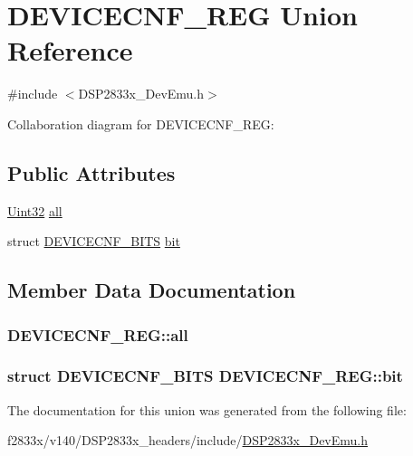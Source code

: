 \hypertarget{union_d_e_v_i_c_e_c_n_f___r_e_g}{}\section{D\+E\+V\+I\+C\+E\+C\+N\+F\+\_\+\+R\+E\+G Union Reference}
\label{union_d_e_v_i_c_e_c_n_f___r_e_g}


{\ttfamily \#include $<$D\+S\+P2833x\+\_\+\+Dev\+Emu.\+h$>$}



Collaboration diagram for D\+E\+V\+I\+C\+E\+C\+N\+F\+\_\+\+R\+E\+G\+:
\subsection*{Public Attributes}
\begin{DoxyCompactItemize}
\item 
\hyperlink{_d_s_p2833x___device_8h_aba99025e657f892beb7ff31cecf64653}{Uint32} \hyperlink{union_d_e_v_i_c_e_c_n_f___r_e_g_acc04b119f54ccbaedc4e712bbec732b3}{all}
\item 
struct \hyperlink{struct_d_e_v_i_c_e_c_n_f___b_i_t_s}{D\+E\+V\+I\+C\+E\+C\+N\+F\+\_\+\+B\+I\+T\+S} \hyperlink{union_d_e_v_i_c_e_c_n_f___r_e_g_a903d04047b135357d6349d10de0faf89}{bit}
\end{DoxyCompactItemize}


\subsection{Member Data Documentation}
\hypertarget{union_d_e_v_i_c_e_c_n_f___r_e_g_acc04b119f54ccbaedc4e712bbec732b3}{}
\subsubsection[{all}]{ D\+E\+V\+I\+C\+E\+C\+N\+F\+\_\+\+R\+E\+G\+::all}\label{union_d_e_v_i_c_e_c_n_f___r_e_g_acc04b119f54ccbaedc4e712bbec732b3}
\hypertarget{union_d_e_v_i_c_e_c_n_f___r_e_g_a903d04047b135357d6349d10de0faf89}{}
\subsubsection[{bit}]{\setlength{\rightskip}{0pt plus 5cm}struct {\bf D\+E\+V\+I\+C\+E\+C\+N\+F\+\_\+\+B\+I\+T\+S} D\+E\+V\+I\+C\+E\+C\+N\+F\+\_\+\+R\+E\+G\+::bit}\label{union_d_e_v_i_c_e_c_n_f___r_e_g_a903d04047b135357d6349d10de0faf89}


The documentation for this union was generated from the following file\+:\begin{DoxyCompactItemize}
\item 
f2833x/v140/\+D\+S\+P2833x\+\_\+headers/include/\hyperlink{_d_s_p2833x___dev_emu_8h}{D\+S\+P2833x\+\_\+\+Dev\+Emu.\+h}\end{DoxyCompactItemize}
